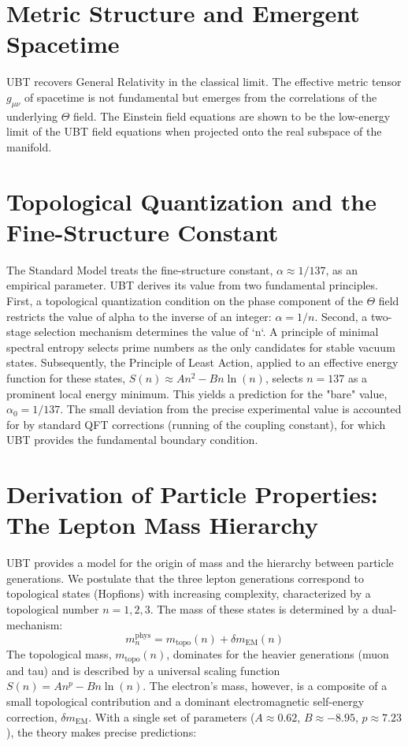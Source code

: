 \documentclass[12pt, a4paper]{article}
\begin{document}
\section{Metric Structure and Emergent Spacetime}
UBT recovers General Relativity in the classical limit. The effective metric tensor \( g_{\mu\nu} \) of spacetime is not fundamental but emerges from the correlations of the underlying \( \Theta \) field. The Einstein field equations are shown to be the low-energy limit of the UBT field equations when projected onto the real subspace of the manifold.

\section{Topological Quantization and the Fine-Structure Constant}
The Standard Model treats the fine-structure constant, \( \alpha \approx 1/137 \), as an empirical parameter. UBT derives its value from two fundamental principles. First, a topological quantization condition on the phase component of the \( \Theta \) field restricts the value of alpha to the inverse of an integer: \( \alpha = 1/n \). Second, a two-stage selection mechanism determines the value of `n`. A principle of minimal spectral entropy selects prime numbers as the only candidates for stable vacuum states. Subsequently, the Principle of Least Action, applied to an effective energy function for these states, \( S(n) \approx A n^2 - B n \ln(n) \), selects \( n=137 \) as a prominent local energy minimum. This yields a prediction for the "bare" value, \( \alpha_0 = 1/137 \). The small deviation from the precise experimental value is accounted for by standard QFT corrections (running of the coupling constant), for which UBT provides the fundamental boundary condition.

\section{Derivation of Particle Properties: The Lepton Mass Hierarchy}
UBT provides a model for the origin of mass and the hierarchy between particle generations. We postulate that the three lepton generations correspond to topological states (Hopfions) with increasing complexity, characterized by a topological number \(n=1, 2, 3\). The mass of these states is determined by a dual-mechanism:
\begin{equation}
    m_n^{\text{phys}} = m_{\text{topo}}(n) + \delta m_{\text{EM}}(n)
\end{equation}
The topological mass, \( m_{\text{topo}}(n) \), dominates for the heavier generations (muon and tau) and is described by a universal scaling function \( S(n) = A n^p - B n \ln(n) \). The electron's mass, however, is a composite of a small topological contribution and a dominant electromagnetic self-energy correction, \( \delta m_{\text{EM}} \). With a single set of parameters (\( A \approx 0.62 \), \( B \approx -8.95 \), \( p \approx 7.23 \)), the theory makes precise predictions:
\end{document}
